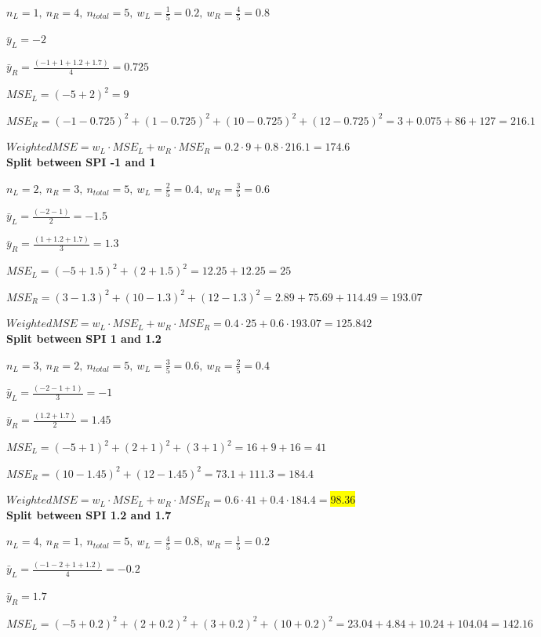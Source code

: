 \documentclass{article}
\begin{document}
$n_L = 1, \ n_R = 4, \ n_{total} = 5, \ w_L = \frac{1}{5} = 0.2, \ w_R = \frac{4}{5} = 0.8$

$\bar{y}_L = -2$

$\bar{y}_R = \frac{(-1 + 1 + 1.2 + 1.7)}{4} = 0.725$

$MSE_L = (-5 + 2)^2 = 9$

$MSE_R = (-1 - 0.725)^2 + (1 - 0.725)^2 + (10 - 0.725)^2 + (12 - 0.725)^2 = 3 + 0.075 + 86 + 127 = 216.1$

$Weighted MSE = w_L \cdot MSE_L + w_R \cdot MSE_R = 0.2 \cdot 9 + 0.8 \cdot 216.1 = 174.6$
\\
\textbf{Split between SPI -1 and 1}

$n_L = 2, \ n_R = 3, \ n_{total} = 5, \ w_L = \frac{2}{5} = 0.4, \ w_R = \frac{3}{5} = 0.6$

$\bar{y}_L = \frac{(-2 - 1)}{2} = -1.5$

$\bar{y}_R = \frac{(1 + 1.2 + 1.7)}{3} = 1.3$

$MSE_L = (-5 + 1.5)^2 + (2 + 1.5)^2 = 12.25 + 12.25 = 25$

$MSE_R = (3 - 1.3)^2 + (10 - 1.3)^2 + (12 - 1.3)^2 = 2.89 + 75.69 + 114.49 = 193.07$

$Weighted MSE = w_L \cdot MSE_L + w_R \cdot MSE_R = 0.4 \cdot 25 + 0.6 \cdot 193.07 = 125.842$
\\
\textbf{Split between SPI 1 and 1.2}

$n_L = 3, \ n_R = 2, \ n_{total} = 5, \ w_L = \frac{3}{5} = 0.6, \ w_R = \frac{2}{5} = 0.4$

$\bar{y}_L = \frac{(-2 - 1 + 1)}{3} = -1$

$\bar{y}_R = \frac{(1.2 + 1.7)}{2} = 1.45$

$MSE_L = (-5 + 1)^2 + (2 + 1)^2 + (3 + 1)^2 = 16 + 9 + 16 = 41$

$MSE_R = (10 - 1.45)^2 + (12 - 1.45)^2 = 73.1 + 111.3 = 184.4$

$Weighted MSE = w_L \cdot MSE_L + w_R \cdot MSE_R = 0.6 \cdot 41 + 0.4 \cdot 184.4 =$\colorbox{yellow}{$98.36$}
\\
\textbf{Split between SPI 1.2 and 1.7}

$n_L = 4, \ n_R = 1, \ n_{total} = 5, \ w_L = \frac{4}{5} = 0.8, \ w_R = \frac{1}{5} = 0.2$

$\bar{y}_L = \frac{(-1 - 2 + 1 + 1.2)}{4} = -0.2$

$\bar{y}_R = 1.7$

$MSE_L = (-5 + 0.2)^2 + (2 + 0.2)^2 + (3 + 0.2)^2 + (10 + 0.2)^2 = 23.04 + 4.84 + 10.24 + 104.04 = 142.16$
\end{document}
